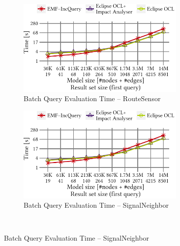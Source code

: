 \begin{figure}[ht]
\begin{center}
	\begin{subfigure}[t]{0.48\textwidth}\centering
	    \includegraphics[width=0.9\textwidth]{figures/trainBenchmark_User_BatchValid_RouteSensor}
	    \caption{Batch Query Evaluation Time -- RouteSensor}
	    \label{fig:BatchValid_RouteSensor}
	\end{subfigure}
	\begin{subfigure}[t]{0.48\textwidth}\centering
	    \includegraphics[width=0.9\textwidth]{figures/trainBenchmark_User_BatchValid_RouteSensor}
	    \caption{Batch Query Evaluation Time -- SignalNeighbor}
	    \label{fig:BatchValid_SignalNeighbor}
	\end{subfigure} \\


\end{center}
\end{figure}
